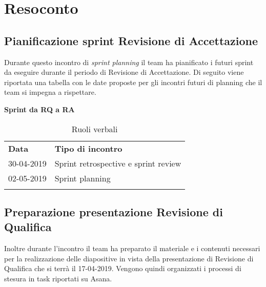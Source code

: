 \clearpage
\section{Resoconto}
	\subsection{Pianificazione sprint Revisione di Accettazione}
	\label{sec:sprint}
	Durante questo incontro di \textit{sprint planning} il team ha pianificato i futuri sprint da eseguire durante il periodo di Revisione di Accettazione. Di seguito viene riportata una tabella con le date proposte per gli incontri futuri di planning che il team si impegna a rispettare.
	\begin{center}
		\textbf{Sprint da RQ a RA}
		\renewcommand{\arraystretch}{1.5}
		\begin{longtable}{  p{2.5cm} p{6cm} }
			\rowcolor{tableHeadYellow}
			\textbf{Data}&\textbf{Tipo di incontro}\\
			30-04-2019 & Sprint retrospective e sprint review \\
			02-05-2019 & Sprint planning\\
			\rowcolor{white}
			\caption{Ruoli verbali}
			\label{sec:tabella2}
		\end{longtable}	
	\end{center}
	\subsection{Preparazione presentazione Revisione di Qualifica}
	\label{sec:presentazione}
	Inoltre durante l'incontro il team ha preparato il materiale e i contenuti necessari per la realizzazione delle diapositive in vista della presentazione di Revisione di Qualifica che si terrà il 17-04-2019.
	Vengono quindi organizzati i processi di stesura in task riportati su Asana.
